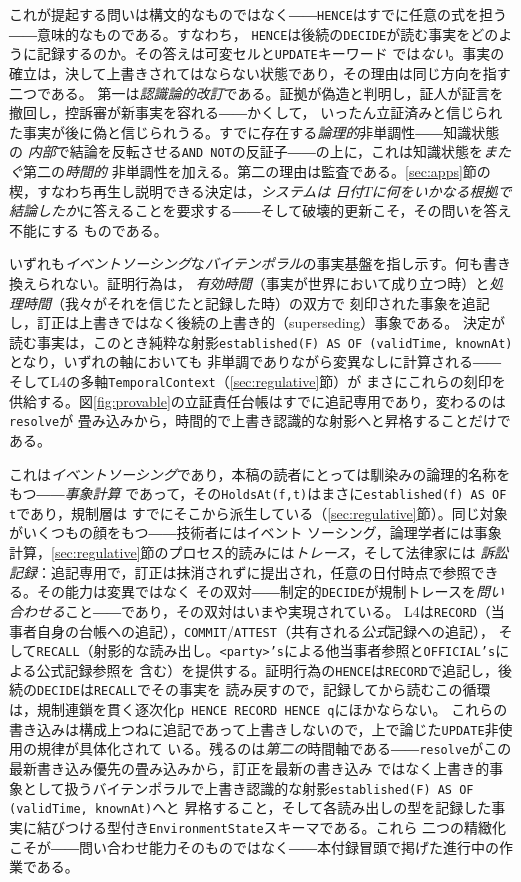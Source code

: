 \documentclass[11pt,a4paper]{ltjsarticle}
\newcommand{\code}[1]{\texttt{\small #1}}
\begin{document}
これが提起する問いは構文的なものではなく――\code{HENCE}はすでに任意の式を担う――意味的なものである。すなわち，
\code{HENCE}は後続の\code{DECIDE}が読む事実をどのように記録するのか。その答えは可変セルと\code{UPDATE}キーワード
では\emph{ない}。事実の確立は，決して上書きされてはならない状態であり，その理由は同じ方向を指す二つである。
第一は\emph{認識論的改訂}である。証拠が偽造と判明し，証人が証言を撤回し，控訴審が新事実を容れる――かくして，
いったん立証済みと信じられた事実が後に偽と信じられうる。すでに存在する\emph{論理的}非単調性――知識状態の
\emph{内部}で結論を反転させる\code{AND NOT}の反証子――の上に，これは知識状態を\emph{またぐ}第二の\emph{時間的}
非単調性を加える。第二の理由は監査である。\ref{sec:apps}節の楔，すなわち再生し説明できる決定は，\emph{システムは
日付$T$に何をいかなる根拠で結論したか}に答えることを要求する――そして破壊的更新こそ，その問いを答え不能にする
ものである。

いずれも\emph{イベントソーシング}な\emph{バイテンポラル}の事実基盤を指し示す。何も書き換えられない。証明行為は，
\emph{有効時間}（事実が世界において成り立つ時）と\emph{処理時間}（我々がそれを信じたと記録した時）の双方で
刻印された事象を追記し\cite{snodgrass2000temporal}，訂正は上書きではなく後続の上書き的（superseding）事象である。
決定が読む事実は，このとき純粋な射影\code{established(F) AS OF (validTime, knownAt)}となり，いずれの軸においても
非単調でありながら変異なしに計算される――そしてL4の多軸\code{TemporalContext}（\ref{sec:regulative}節）が
まさにこれらの刻印を供給する。図\ref{fig:provable}の立証責任台帳はすでに追記専用であり，変わるのは\code{resolve}が
畳み込みから，時間的で上書き認識的な射影へと昇格することだけである。

これは\emph{イベントソーシング}であり，本稿の読者にとっては馴染みの論理的名称をもつ――\emph{事象計算}
\cite{kowalski1986events}であって，その\code{HoldsAt(f,t)}はまさに\code{established(f) AS OF t}であり，規制層は
すでにそこから派生している（\ref{sec:regulative}節）。同じ対象がいくつもの顔をもつ――技術者にはイベント
ソーシング，論理学者には事象計算，\ref{sec:regulative}節のプロセス的読みには\emph{トレース}，そして法律家には
\emph{訴訟記録}：追記専用で，訂正は抹消されずに提出され，任意の日付時点で参照できる。その能力は変異ではなく
その双対――制定的\code{DECIDE}が規制トレースを\emph{問い合わせる}こと――であり，その双対はいまや実現されている。
L4は\code{RECORD}（当事者自身の台帳への追記），\code{COMMIT}/\code{ATTEST}（共有される\emph{公式}記録への追記），
そして\code{RECALL}（射影的な読み出し。\code{<party>'s}による他当事者参照と\code{OFFICIAL's}による公式記録参照を
含む）を提供する。証明行為の\code{HENCE}は\code{RECORD}で追記し，後続の\code{DECIDE}は\code{RECALL}でその事実を
読み戻すので，記録してから読むこの循環は，規制連鎖を貫く逐次化\mbox{\code{p HENCE RECORD HENCE q}}にほかならない。
これらの書き込みは構成上つねに追記であって上書きしないので，上で論じた\code{UPDATE}非使用の規律が具体化されて
いる。残るのは\emph{第二の}時間軸である――\code{resolve}がこの最新書き込み優先の畳み込みから，訂正を最新の書き込み
ではなく上書き的事象として扱うバイテンポラルで上書き認識的な射影\code{established(F) AS OF (validTime, knownAt)}へと
昇格すること，そして各読み出しの型を記録した事実に結びつける型付き\code{EnvironmentState}スキーマである。これら
二つの精緻化こそが――問い合わせ能力そのものではなく――本付録冒頭で掲げた進行中の作業である。



\end{document}

